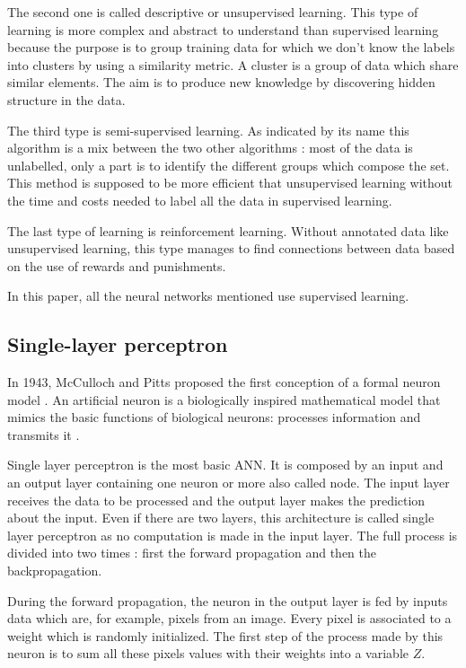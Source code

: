 The second one is called descriptive or unsupervised learning. This type of learning is more complex and abstract to understand than supervised learning because the purpose is to group training data for which we don't know the labels into clusters by using a similarity metric. 
A cluster is a group of data which share similar elements.
The aim is to produce new knowledge by discovering hidden structure in the data.

The third type is semi-supervised learning. As indicated by its name this algorithm is a mix between the two other algorithms : most of the data is unlabelled, only a part is to identify the different groups which compose the set. This method is supposed to be more efficient that unsupervised learning without the time and costs needed to label all the data in supervised learning.

The last type of learning is reinforcement learning. Without annotated data like unsupervised learning, this type manages to find connections between data based on the use of rewards and punishments.

In this paper, all the neural networks mentioned use supervised learning.



\subsection{Single-layer perceptron}

In 1943, McCulloch and Pitts proposed the first conception of a formal neuron model \cite{mcculloch}. An artificial neuron is a biologically inspired mathematical model that mimics the basic functions of biological neurons: processes information and transmits it \cite{neuron}. 

Single layer perceptron is the most basic ANN. It is composed by an input and an output layer containing one neuron or more also called node. The input layer receives the data to be processed and the output layer makes the prediction about the input. Even if there are two layers, this architecture is called single layer perceptron as no computation is made in the input layer. The full process is divided into two times : first the forward propagation and then the backpropagation. 

During the forward propagation, the neuron in the output layer is fed by inputs data which are, for example, pixels from an image. Every pixel is associated to a weight which is randomly initialized. 
The first step of the process made by this neuron is to sum all these pixels values with their weights into a variable $Z$.

